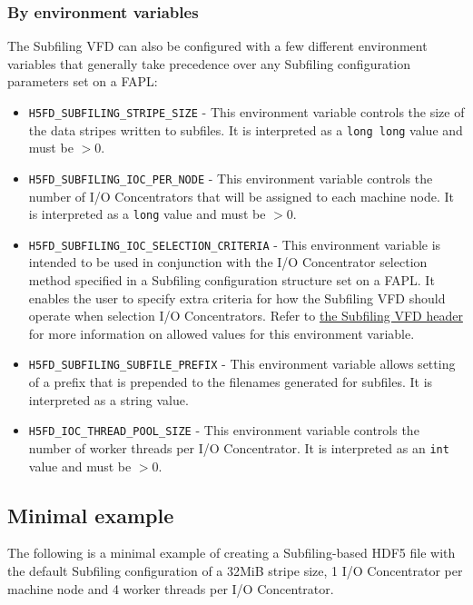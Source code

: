 \documentclass[../main.tex]{subfiles}
\begin{document}
\subsubsection{By environment variables}
\label{sec:envvars}

The Subfiling VFD can also be configured with a few different environment variables that
generally take precedence over any Subfiling configuration parameters set on a FAPL:

\begin{itemize}
\item \texttt{H5FD\_SUBFILING\_STRIPE\_SIZE} - This environment variable controls the size of
the data stripes written to subfiles. It is interpreted as a \texttt{long long} value and must
be $> 0$.

\item \texttt{H5FD\_SUBFILING\_IOC\_PER\_NODE} - This environment variable controls the number
of I/O Concentrators that will be assigned to each machine node. It is interpreted as a \texttt{long}
value and must be $> 0$.

\item \texttt{H5FD\_SUBFILING\_IOC\_SELECTION\_CRITERIA} - This environment variable is intended
to be used in conjunction with the I/O Concentrator selection method specified in a Subfiling
configuration structure set on a \Gls{FAPL}. It enables the user to specify extra criteria for
how the Subfiling VFD should operate when selection I/O Concentrators. Refer to
\href{https://github.com/HDFGroup/hdf5/blob/develop/src/H5FDsubfiling/H5FDsubfiling.h}{the Subfiling VFD header}
for more information on allowed values for this environment variable.

\item \texttt{H5FD\_SUBFILING\_SUBFILE\_PREFIX} - This environment variable allows setting of a
prefix that is prepended to the filenames generated for subfiles. It is interpreted as a string
value.

\item \texttt{H5FD\_IOC\_THREAD\_POOL\_SIZE} - This environment variable controls the number of
worker threads per I/O Concentrator. It is interpreted as an \texttt{int} value and must be $> 0$.
\end{itemize}

\subsection{Minimal example}

The following is a minimal example of creating a Subfiling-based HDF5 file
with the default Subfiling configuration of a 32MiB stripe size, 1 I/O Concentrator
per machine node and 4 worker threads per I/O Concentrator. 
\end{document}
